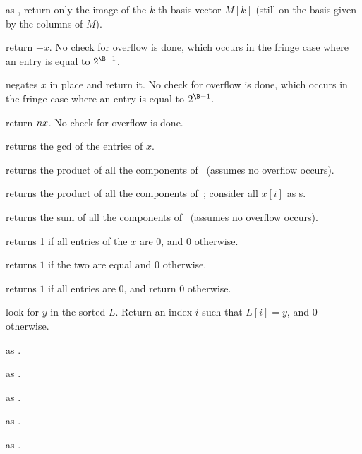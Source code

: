  as
, return only the image of the $k$-th basis vector $M[k]$
(still on the basis given by the columns of $M$).


 return $-x$. No check for overflow is done, which
occurs in the fringe case where an entry is equal to $2^{\B-1}$.

 negates $x$ in place and return it. No check
for overflow is done, which occurs in the fringe case where an entry is equal
to $2^{\B-1}$.



 return $n\*x$. No check for overflow is
done.

 returns the gcd of the entries of $x$.


 returns the product of all the components
of~ (assumes no overflow occurs).

 returns the product of all the components
of~; consider all $x[i]$ as s.

 returns the sum of all the components
of~ (assumes no overflow occurs).

 returns 1 if all entries of the  $x$ are $0$,
and $0$ otherwise.

 returns $1$ if the two  are equal
and $0$ otherwise.

 returns $1$ if all entries are $0$, and return
$0$ otherwise.

 look for $y$ in the sorted
 $L$. Return an index $i$ such that $L[i] = y$, and  $0$ otherwise.

 as .

 as .

 as .

 as .

 as .

